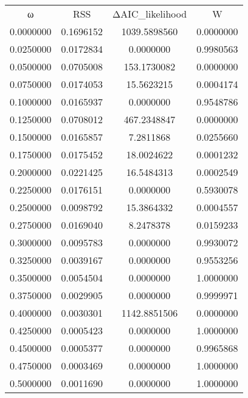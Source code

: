 \begin{tabular}{cccc}
ω & RSS & ΔAIC_likelihood & W\\
0.0000000 & 0.1696152 & 1039.5898560 & 0.0000000\\
0.0250000 & 0.0172834 & 0.0000000 & 0.9980563\\
0.0500000 & 0.0705008 & 153.1730082 & 0.0000000\\
0.0750000 & 0.0174053 & 15.5623215 & 0.0004174\\
0.1000000 & 0.0165937 & 0.0000000 & 0.9548786\\
0.1250000 & 0.0708012 & 467.2348847 & 0.0000000\\
0.1500000 & 0.0165857 & 7.2811868 & 0.0255660\\
0.1750000 & 0.0175452 & 18.0024622 & 0.0001232\\
0.2000000 & 0.0221425 & 16.5484313 & 0.0002549\\
0.2250000 & 0.0176151 & 0.0000000 & 0.5930078\\
0.2500000 & 0.0098792 & 15.3864332 & 0.0004557\\
0.2750000 & 0.0169040 & 8.2478378 & 0.0159233\\
0.3000000 & 0.0095783 & 0.0000000 & 0.9930072\\
0.3250000 & 0.0039167 & 0.0000000 & 0.9553256\\
0.3500000 & 0.0054504 & 0.0000000 & 1.0000000\\
0.3750000 & 0.0029905 & 0.0000000 & 0.9999971\\
0.4000000 & 0.0030301 & 1142.8851506 & 0.0000000\\
0.4250000 & 0.0005423 & 0.0000000 & 1.0000000\\
0.4500000 & 0.0005377 & 0.0000000 & 0.9965868\\
0.4750000 & 0.0003469 & 0.0000000 & 1.0000000\\
0.5000000 & 0.0011690 & 0.0000000 & 1.0000000\\
\end{tabular}
